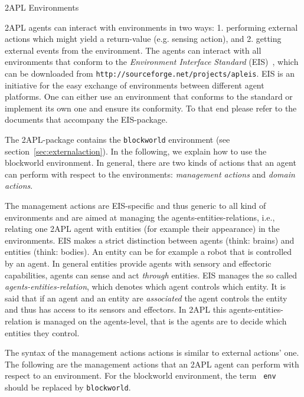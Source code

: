 
\begin{chapter}{2APL Environments}
\label{chap:environment}

2APL agents can interact with environments in two ways: 1.
performing external actions which might yield a return-value (e.g.
sensing action), and 2. getting external events from the
environment. The agents can interact with all environments that
conform to the \emph{Environment Interface Standard}
(EIS)~\cite{EnvIntProMAS}, which can be downloaded from
\texttt{http://sourceforge.net/projects/apleis}. EIS is an
initiative for the easy exchange of environments between different
agent platforms. One can either use an environment that conforms to
the standard or implement its own one and ensure its conformity. To
that end please refer to the documents that accompany the
EIS-package.

The 2APL-package contains the \texttt{blockworld} environment
(see section~\ref{sec:externalaction}).
In the following, we explain
how to use the blockworld environment. In general, there are two kinds of
actions that an agent can perform with respect to the
environments: \emph{management actions} and \emph{domain actions}.


    The management actions are EIS-specific and thus generic to all kind of environments and are aimed
    at managing the agents-entities-relations, i.e., relating one 2APL agent with
    entities (for example their appearance) in the environments.
    EIS makes a strict distinction between agents (think: brains) and entities (think: bodies).
    An entity can be for example a robot that is controlled by an agent.
    In general entities provide agents with sensory and effectoric capabilities, agents can
    sense and act \emph{through} entities.
    EIS manages the
    so called \emph{agents-entities-relation}, which denotes which agent controls which
    entity. It is said that if an agent and an entity are \emph{associated} the agent controls the
    entity and thus has access to its sensors and effectors.
    In 2APL this agents-entities-relation is managed on the agents-level, that is the agents
    are to decide which entities they control.

    The syntax of the management actions
    actions is similar to external actions' one. The following are the
    management actions that an 2APL agent can perform with respect
    to an environment. For the blockworld environment, the term {\tt
    env} should be replaced by {\tt blockworld}.


\end{chapter}

